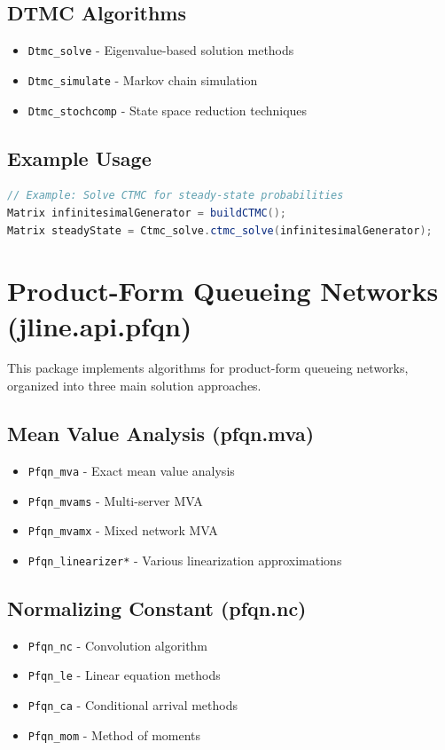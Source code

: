 \subsection{DTMC Algorithms}
\begin{itemize}
\item \texttt{Dtmc\_solve} - Eigenvalue-based solution methods
\item \texttt{Dtmc\_simulate} - Markov chain simulation
\item \texttt{Dtmc\_stochcomp} - State space reduction techniques
\end{itemize}

\subsection{Example Usage}
\begin{lstlisting}[language = java, basicstyle=\ttfamily\scriptsize]
// Example: Solve CTMC for steady-state probabilities
Matrix infinitesimalGenerator = buildCTMC();
Matrix steadyState = Ctmc_solve.ctmc_solve(infinitesimalGenerator);
\end{lstlisting}

\section{Product-Form Queueing Networks (jline.api.pfqn)}

This package implements algorithms for product-form queueing networks, organized into three main solution approaches.

\subsection{Mean Value Analysis (pfqn.mva)}
\begin{itemize}
\item \texttt{Pfqn\_mva} - Exact mean value analysis
\item \texttt{Pfqn\_mvams} - Multi-server MVA
\item \texttt{Pfqn\_mvamx} - Mixed network MVA
\item \texttt{Pfqn\_linearizer*} - Various linearization approximations
\end{itemize}

\subsection{Normalizing Constant (pfqn.nc)}
\begin{itemize}
\item \texttt{Pfqn\_nc} - Convolution algorithm
\item \texttt{Pfqn\_le} - Linear equation methods
\item \texttt{Pfqn\_ca} - Conditional arrival methods
\item \texttt{Pfqn\_mom} - Method of moments
\end{itemize}

